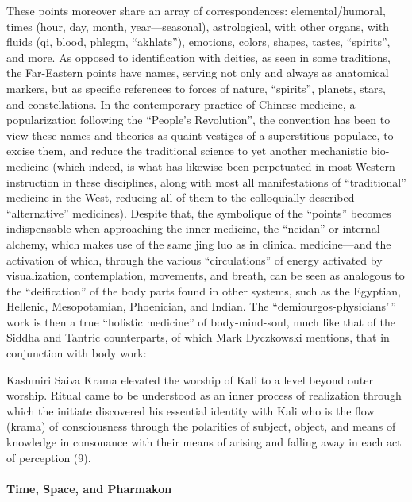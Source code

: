 These points moreover share an array of correspondences: elemental/humoral, times (hour, day, month, year---seasonal), astrological, with other organs, with fluids (qi, blood, phlegm, ``akhlats''), emotions, colors, shapes, tastes, ``spirits'', and more. As opposed to identification with deities, as seen in some traditions, the Far-Eastern points have names, serving not only and always as anatomical markers, but as specific references to forces of nature, ``spirits'', planets, stars, and constellations. In the contemporary practice of Chinese medicine, a popularization following the ``People's Revolution'', the convention has been to view these names and theories as quaint vestiges of a superstitious populace, to excise them, and reduce the traditional science to yet another mechanistic bio-medicine (which indeed, is what has likewise been perpetuated in most Western instruction in these disciplines, along with most all manifestations of ``traditional'' medicine in the West, reducing all of them to the colloquially described ``alternative'' medicines). Despite that, the symbolique of the ``points'' becomes indispensable when approaching the inner medicine, the ``neidan'' or internal alchemy, which makes use of the same jing luo as in clinical medicine---and the activation of which, through the various ``circulations'' of energy activated by visualization, contemplation, movements, and breath, can be seen as analogous to the ``deification'' of the body parts found in other systems, such as the Egyptian, Hellenic, Mesopotamian, Phoenician, and Indian. The ``demiourgos-physicians'\,'' work is then a true ``holistic medicine'' of body-mind-soul, much like that of the Siddha and Tantric counterparts, of which Mark Dyczkowski mentions, that in conjunction with body work:

\begin{quotex}
Kashmiri Saiva Krama elevated the worship of Kali to a level beyond outer worship. Ritual came to be understood as an inner process of realization through which the initiate discovered his essential identity with Kali who is the flow (krama) of consciousness through the polarities of subject, object, and means of knowledge in consonance with their means of arising and falling away in each act of perception (9).
\end{quotex}


\paragraph{Time, Space, and Pharmakon}


